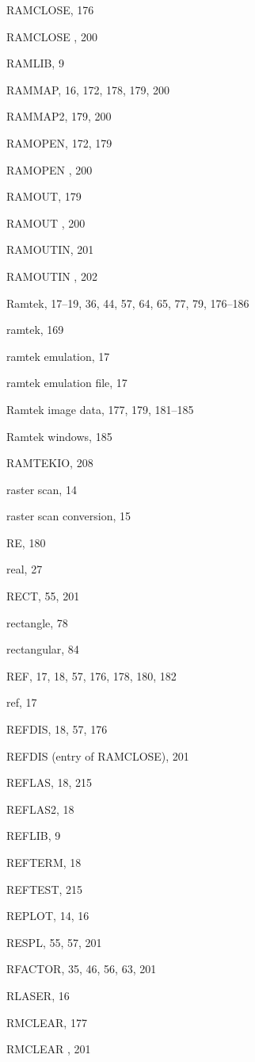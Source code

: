 \begin{theindex}
  \item RAMCLOSE, 176
  \item RAMCLOSE , 200
  \item RAMLIB, 9
  \item RAMMAP, 16, 172, 178, 179, 200
  \item RAMMAP2, 179, 200
  \item RAMOPEN, 172, 179
  \item RAMOPEN , 200
  \item RAMOUT, 179
  \item RAMOUT , 200
  \item RAMOUTIN, 201
  \item RAMOUTIN , 202
  \item Ramtek, 17--19, 36, 44, 57, 64, 65, 77, 79, 176--186
  \item ramtek, 169
  \item ramtek emulation, 17
  \item ramtek emulation file, 17
  \item Ramtek image data, 177, 179, 181--185
  \item Ramtek windows, 185
  \item RAMTEKIO, 208
  \item raster scan, 14
  \item raster scan conversion, 15
  \item RE, 180
  \item real, 27
  \item RECT, 55, 201
  \item rectangle, 78
  \item rectangular, 84
  \item REF, 17, 18, 57, 176, 178, 180, 182
  \item ref, 17
  \item REFDIS, 18, 57, 176
  \item REFDIS (entry of RAMCLOSE), 201
  \item REFLAS, 18, 215
  \item REFLAS2, 18
  \item REFLIB, 9
  \item REFTERM, 18
  \item REFTEST, 215
  \item REPLOT, 14, 16
  \item RESPL, 55, 57, 201
  \item RFACTOR, 35, 46, 56, 63, 201
  \item RLASER, 16
  \item RMCLEAR, 177
  \item RMCLEAR , 201

\end{theindex}
